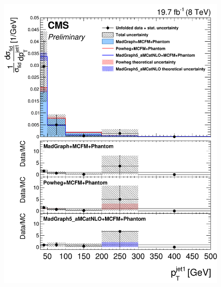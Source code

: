 \begin{figure}[hbtp]
  \begin{center}
    \includegraphics[width=\cmsFigWidth]{Figures/DiffCrossSecZZTo4mPtJet1_Unfolded_fr_MadGraph_norm.png}     

\end{center}
\end{figure}
